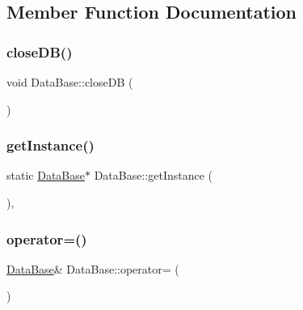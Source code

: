\subsection{Member Function Documentation}
\mbox{\label{class_data_base_adb17c56e22c3fe77bbd682bee8811a56}} 
\subsubsection{\texorpdfstring{close\+D\+B()}{closeDB()}}
{\footnotesize\ttfamily void Data\+Base\+::close\+DB (\begin{DoxyParamCaption}{ }\end{DoxyParamCaption})\hspace{0.3cm}{\ttfamily [inline]}}

\mbox{\label{class_data_base_abe2f75c0d6067414a1fbb22dc166ca46}} 
\subsubsection{\texorpdfstring{get\+Instance()}{getInstance()}}
{\footnotesize\ttfamily static \mbox{\hyperlink{class_data_base}{Data\+Base}}$\ast$ Data\+Base\+::get\+Instance (\begin{DoxyParamCaption}{ }\end{DoxyParamCaption})\hspace{0.3cm}{\ttfamily [inline]}, {\ttfamily [static]}}

\mbox{\label{class_data_base_ac5c47c845425deafd990f249077297ab}} 
\subsubsection{\texorpdfstring{operator=()}{operator=()}}
{\footnotesize\ttfamily \mbox{\hyperlink{class_data_base}{Data\+Base}}\& Data\+Base\+::operator= (\begin{DoxyParamCaption}\item[{\mbox{\hyperlink{class_data_base}{Data\+Base}} \&}]{ }\end{DoxyParamCaption})\hspace{0.3cm}{\ttfamily [protected]}}

